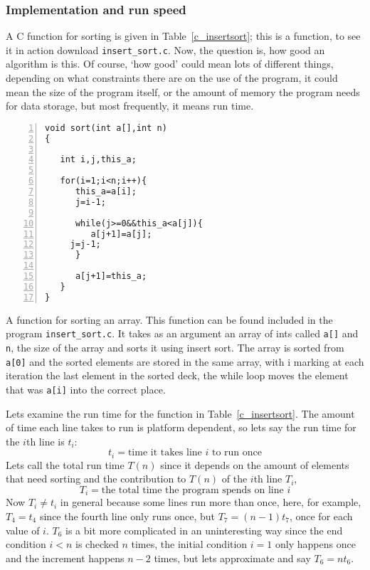 \documentclass[11pt,a4paper]{scrartcl}
\begin{document}
\subsubsection{Implementation and run speed}

A C function for sorting is given in Table~\ref{c_insertsort}; this is
a function, to see it in action download \texttt{insert\_sort.c}. Now,
the question is, how good an algorithm is this. Of course, \lq{}how
good\rq{} could mean lots of different things, depending on what
constraints there are on the use of the program, it could mean the
size of the program itself, or the amount of memory the program needs
for data storage, but most frequently, it means run time.


\begin{table}
\begin{lstlisting}[numbers=left]
void sort(int a[],int n)
{

   int i,j,this_a;

   for(i=1;i<n;i++){
      this_a=a[i];
      j=i-1;

      while(j>=0&&this_a<a[j]){
         a[j+1]=a[j];
	 j=j-1;
      }

      a[j+1]=this_a;
   }
}
\end{lstlisting}
\caption{A function for sorting an array. This function can be found included in the program \texttt{insert\_sort.c}. It takes as an argument an array of ints called \texttt{a[]} and \texttt{n}, the size of the array and sorts it using insert sort. The array is sorted from \texttt{a[0]} and the sorted elements are stored in the same array, with i marking at each iteration the last element in the sorted deck, the while loop moves the element that was \texttt{a[i]} into the correct place.\label{c_insertsort}}
\end{table}

Lets examine the run time for the function in
Table~\ref{c_insertsort}. The amount of time each line takes to run is
platform dependent, so lets say the run time for the $i$th line is
$t_i$:
\begin{equation}
t_i=\mbox{time it takes line }i\mbox{ to run once}
\end{equation}
Lets call the total run time $T(n)$ since it depends on the
amount of elements that need sorting and the contribution to $T(n)$ of
the $i$th line $T_i$, 
\begin{equation}
T_i=\mbox{the total time the program spends on line }i
\end{equation}
Now $T_i\not= t_i$ in general because some lines run more than once,
here, for example, $T_4=t_4$ since the fourth line only runs once, but
$T_7=(n-1)t_7$, once for each value of $i$. $T_6$ is a bit more
complicated in an uninteresting way since the end condition $i<n$ is
checked $n$ times, the initial condition $i=1$ only happens once and
the increment happens $n-2$ times, but lets approximate and say
$T_6=nt_6$.
\end{document}
